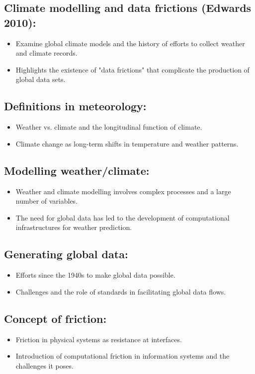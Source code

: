 \documentclass{article}
\begin{document}
\subsection*{Climate modelling and data frictions (Edwards 2010):}
\begin{itemize}
    \item Examine global climate models and the history of efforts to collect weather and climate records.
    \item Highlights the existence of "data frictions" that complicate the production of global data sets.
\end{itemize}

\subsection*{Definitions in meteorology:}
\begin{itemize}
    \item Weather vs. climate and the longitudinal function of climate.
    \item Climate change as long-term shifts in temperature and weather patterns.
\end{itemize}

\subsection*{Modelling weather/climate:}
\begin{itemize}
    \item Weather and climate modelling involves complex processes and a large number of variables.
    \item The need for global data has led to the development of computational infrastructures for weather prediction.
\end{itemize}

\subsection*{Generating global data:}
\begin{itemize}
    \item Efforts since the 1940s to make global data possible.
    \item Challenges and the role of standards in facilitating global data flows.
\end{itemize}

\subsection*{Concept of friction:}
\begin{itemize}
    \item Friction in physical systems as resistance at interfaces.
    \item Introduction of computational friction in information systems and the challenges it poses.
\end{itemize}
\end{document}
